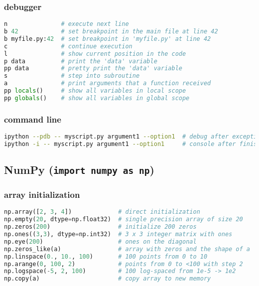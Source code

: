\documentclass[]{article}
\begin{document}
\subsubsection{debugger}\label{debugger}

\begin{lstlisting}[language=Python]
n               # execute next line
b 42            # set breakpoint in the main file at line 42
b myfile.py:42  # set breakpoint in 'myfile.py' at line 42
c               # continue execution
l               # show current position in the code
p data          # print the 'data' variable
pp data         # pretty print the 'data' variable
s               # step into subroutine
a               # print arguments that a function received
pp locals()     # show all variables in local scope
pp globals()    # show all variables in global scope
\end{lstlisting}

\subsubsection{command line}\label{command-line}

\begin{lstlisting}[language=bash]
ipython --pdb -- myscript.py argument1 --option1  # debug after exception
ipython -i -- myscript.py argument1 --option1     # console after finish
\end{lstlisting}

\subsection{\texorpdfstring{NumPy
(\texttt{import\ numpy\ as\ np})}{NumPy (import numpy as np)}}\label{numpy-import-numpy-as-np}

\subsubsection{array initialization}\label{array-initialization}

\begin{lstlisting}[language=Python]
np.array([2, 3, 4])             # direct initialization
np.empty(20, dtype=np.float32)  # single precision array of size 20
np.zeros(200)                   # initialize 200 zeros
np.ones((3,3), dtype=np.int32)  # 3 x 3 integer matrix with ones
np.eye(200)                     # ones on the diagonal
np.zeros_like(a)                # array with zeros and the shape of a
np.linspace(0., 10., 100)       # 100 points from 0 to 10
np.arange(0, 100, 2)            # points from 0 to <100 with step 2
np.logspace(-5, 2, 100)         # 100 log-spaced from 1e-5 -> 1e2
np.copy(a)                      # copy array to new memory
\end{lstlisting}
\end{document}
